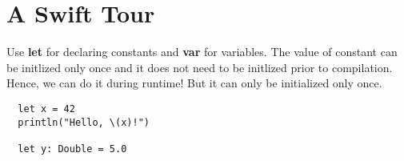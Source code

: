 \section*{A Swift Tour}
Use \textbf{let} for declaring constants and \textbf{var} for variables. The value of constant
can be initlized only once and it does not need to be initlized prior to compilation. Hence, we can
do it during runtime! But it can only be initialized only once.

\begin{verbatim}
  let x = 42
  println("Hello, \(x)!")

  let y: Double = 5.0
\end{verbatim}
